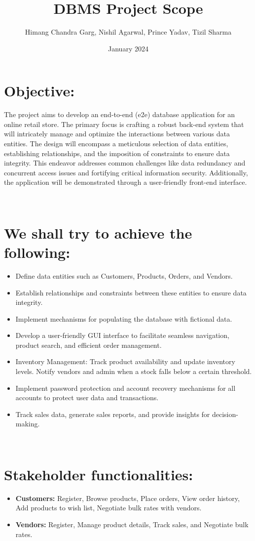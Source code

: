 \documentclass{article}
\title{\textbf{DBMS Project Scope}}
\author{Himang Chandra Garg, Nishil Agarwal, Prince Yadav, Tizil Sharma}
\date{January 2024}
\begin{document}
\maketitle

\section{Objective:}

The project aims to develop an end-to-end (e2e) database application for an online retail store. The primary focus is crafting a robust back-end system that will intricately manage and optimize the interactions between various data entities. The design will encompass a meticulous selection of data entities, establishing relationships, and the imposition of constraints to ensure data integrity. This endeavor addresses common challenges like data redundancy and concurrent access issues and fortifying critical information security. Additionally, the application will be demonstrated through a user-friendly front-end interface.

\
\section{We shall try to achieve the following:}
\begin{itemize}
\item Define data entities such as Customers, Products, Orders, and Vendors.

\item Establish relationships and constraints between these entities to ensure data integrity.

\item Implement mechanisms for populating the database with fictional data.

\item Develop a user-friendly GUI interface to facilitate seamless navigation, product search, and efficient order management.

\item Inventory Management: Track product availability and update inventory levels. Notify vendors and admin when a stock falls below a certain threshold.

\item Implement password protection and account recovery mechanisms for all accounts to protect user data and transactions.

\item Track sales data, generate sales reports, and provide insights for decision-making.
\end{itemize}
\
\section{Stakeholder functionalities:}
\begin{itemize}
\item \textbf{Customers:} Register, Browse products, Place orders, View order history, Add products to wish list, Negotiate bulk rates with vendors.
\item \textbf{Vendors:} Register, Manage product details, Track sales, and Negotiate bulk rates.
\end{itemize}
\end{document}
